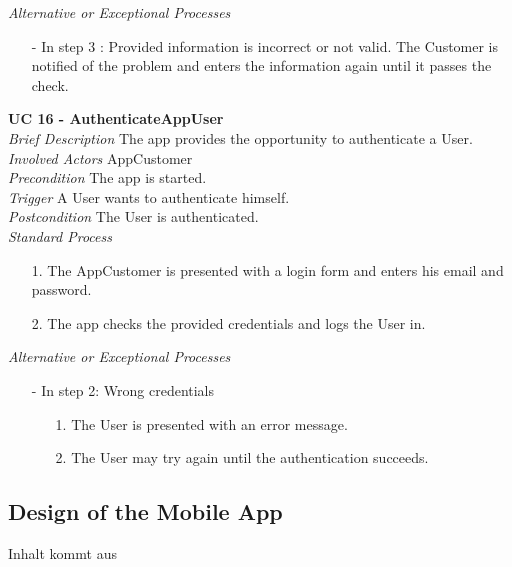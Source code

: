\textit{Alternative or Exceptional Processes}
\begin{itemize}
	\item[-] In step 3 : Provided information is incorrect or not valid. The Customer is	notified of the problem and enters the information again until it passes the check.	
\end{itemize}

\textbf{UC 16 - AuthenticateAppUser}\\ \newline
\textit{Brief Description} The app provides the opportunity to authenticate a User.\\ \newline
\textit{Involved Actors} AppCustomer\\ \newline
\textit{Precondition} The app is started.\\ \newline
\textit{Trigger} A User wants to authenticate himself.\\ \newline
\textit{Postcondition} The User is authenticated.\\ \newline
\textit{Standard Process}
\begin{itemize}[leftmargin=*]
	\item[1.] The AppCustomer is presented with a login form and enters his email and password.
	\item[2.] The app checks the provided credentials and logs the User in.
\end{itemize}

\textit{Alternative or Exceptional Processes}
\begin{itemize}
	\item[-] In step 2: Wrong credentials
	\begin{itemize}
		\item[1.] The User is presented with an error message.
		\item[2.] The User may try again until the authentication succeeds.
	\end{itemize}
\end{itemize}




\subsection{Design of the Mobile App}\label{DesignMobileApp}
Inhalt kommt aus \cite{schnabel}



